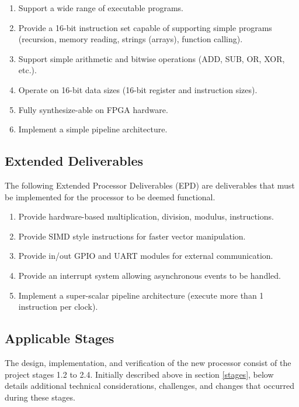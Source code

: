 \documentclass[11pt,a4paper]{report}
\begin{document}
\begin{enumerate}[label=\bfseries CPD\arabic*.]
\item{Support a wide range of executable programs.}
\item{Provide a 16-bit instruction set capable of supporting simple programs (recursion, memory reading, strings (arrays), function calling).}
\item{Support simple arithmetic and bitwise operations (ADD, SUB, OR, XOR, etc.).}
\item{Operate on 16-bit data sizes (16-bit register and instruction sizes).}
\item{Fully synthesize-able on FPGA hardware.}
\item{Implement a simple pipeline architecture.}
\end{enumerate}

\subsection{Extended Deliverables}
The following Extended Processor Deliverables (EPD) are deliverables that must be implemented for the processor to be deemed functional.
\begin{enumerate}[label=\bfseries EPD\arabic*.]
\item{Provide hardware-based multiplication, division, modulus, instructions.}
\item{Provide SIMD style instructions for faster vector manipulation.}
\item{Provide in/out GPIO and UART modules for external communication.}
\item{Provide an interrupt system allowing asynchronous events to be handled.}
\item{Implement a super-scalar pipeline architecture (execute more than 1 instruction per clock).}
\end{enumerate}

\newpage
\subsection{Applicable Stages}
The design, implementation, and verification of the new processor consist of the  project stages 1.2 to 2.4. Initially described above in section \ref{stages}, below details additional technical considerations, challenges, and changes that occurred during these stages.
\end{document}
